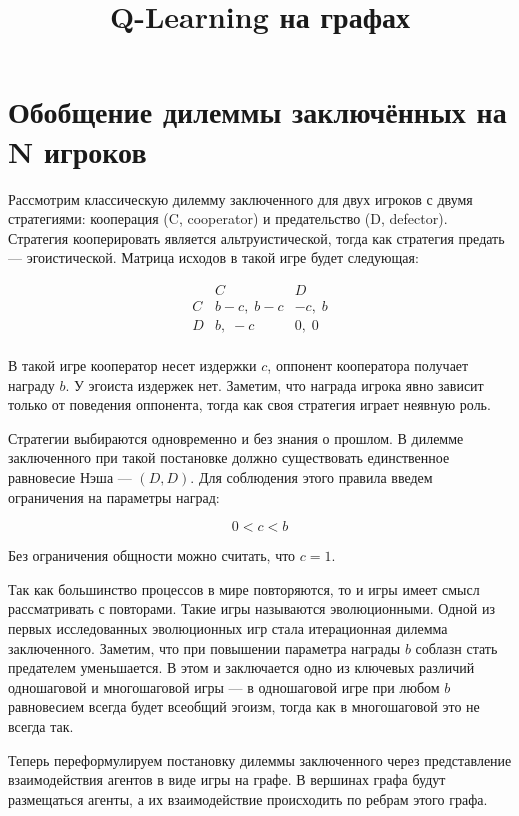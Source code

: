 \documentclass[12pt]{extarticle}
\title {
    Q-Learning на графах
}
\date{}
\begin{document}
\maketitle


\tableofcontents


\section{Обобщение дилеммы заключённых на N игроков}

Рассмотрим классическую дилемму заключенного для двух игроков с двумя стратегиями: кооперация (C, cooperator) и предательство (D, defector). Стратегия кооперировать является альтруистической, тогда как стратегия предать --- эгоистической. Матрица исходов в такой игре будет следующая:

\[
\begin{array}{c|cc}
 & C & D \\
\hline
C & b-c,\; b-c & -c,\; b \\
D & b,\; -c & 0,\; 0 \\
\end{array}
\]

В такой игре кооператор несет издержки $c$, оппонент кооператора получает награду $b$. У эгоиста издержек нет. Заметим, что награда игрока явно зависит только от поведения оппонента, тогда как своя стратегия играет неявную роль.

Стратегии выбираются одновременно и без знания о прошлом. В дилемме заключенного при такой постановке должно существовать единственное равновесие Нэша --- $(D, D)$. Для соблюдения этого правила введем ограничения на параметры наград:

\[
0 < c < b
\]

Без ограничения общности можно считать, что $c = 1$.

Так как большинство процессов в мире повторяются, то и игры имеет смысл рассматривать с повторами. Такие игры называются эволюционными. Одной из первых исследованных эволюционных игр стала итерационная дилемма заключенного. Заметим, что при повышении параметра награды $b$ соблазн стать предателем уменьшается. В этом и заключается одно из ключевых различий одношаговой и многошаговой игры --- в одношаговой игре при любом $b$ равновесием всегда будет всеобщий эгоизм, тогда как в многошаговой это не всегда так.

Теперь переформулируем постановку дилеммы заключенного через представление взаимодействия агентов в виде игры на графе. В вершинах графа будут размещаться агенты, а их взаимодействие происходить по ребрам этого графа.
\end{document}
